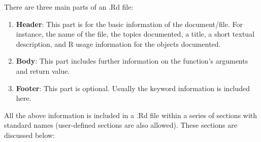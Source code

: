 \documentclass[
]{book}
\begin{document}
There are three main parts of an .Rd file:

\begin{enumerate}
\def\labelenumi{\arabic{enumi}.}
\item
  \textbf{Header}: This part is for the basic information of the document/file. For instance, the name of the file, the topics documented, a title, a short textual description, and R usage information for the objects documented.
\item
  \textbf{Body}: This part includes further information on the function's arguments and return value.
\item
  \textbf{Footer}: This part is optional. Usually the keyword information is included here.
\end{enumerate}

All the above information is included in a .Rd file within a series of sections with standard names (user-defined sections are also allowed). These sections are discussed below:
\end{document}
